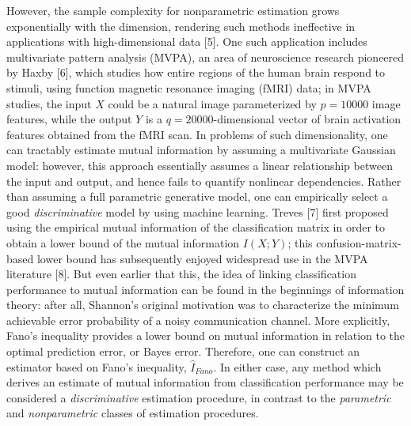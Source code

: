 \documentclass{article}
\begin{document}
However, the sample complexity for nonparametric estimation grows
exponentially with the dimension, rendering such methods ineffective
in applications with high-dimensional data [5].  One such
application includes multivariate pattern analysis (MVPA), an area of
neuroscience research pioneered by Haxby [6], which studies how
entire regions of the human brain respond to stimuli, using function
magnetic resonance imaging (fMRI) data; in MVPA studies, the input $X$
could be a natural image parameterized by $p = 10000$ image features,
while the output $Y$ is a $q=20000$-dimensional vector of brain
activation features obtained from the fMRI scan.  In problems of such
dimensionality, one can tractably estimate mutual information by
assuming a multivariate Gaussian model: however, this approach
essentially assumes a linear relationship between the input and
output, and hence fails to quantify nonlinear dependencies.  Rather
than assuming a full parametric generative model, one can empirically
select a good \emph{discriminative} model by using machine learning.
Treves [7] first proposed using the empirical mutual information of
the classification matrix in order to obtain a lower bound of the
mutual information $I(X; Y)$; this confusion-matrix-based lower bound
has subsequently enjoyed widespread use in the MVPA literature
[8].  But even earlier that this, the idea of linking
classification performance to mutual information can be found in the
beginnings of information theory: after all, Shannon's original
motivation was to characterize the minimum achievable error
probability of a noisy communication channel.  More explicitly, Fano's
inequality provides a lower bound on mutual information in relation to
the optimal prediction error, or Bayes error.  Therefore, one can
construct an estimator based on Fano's inequality, $\hat{I}_{Fano}$.
In either case, any method which derives an estimate of mutual
information from classification performance may be considered a
\emph{discriminative} estimation procedure, in contrast to the
\emph{parametric} and \emph{nonparametric} classes of estimation
procedures.
\end{document}
